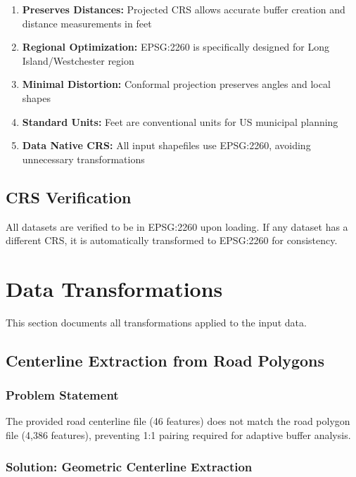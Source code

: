 \documentclass[11pt,letterpaper]{article}
\begin{document}
\begin{enumerate}
    \item \textbf{Preserves Distances:} Projected CRS allows accurate buffer creation and distance measurements in feet
    \item \textbf{Regional Optimization:} EPSG:2260 is specifically designed for Long Island/Westchester region
    \item \textbf{Minimal Distortion:} Conformal projection preserves angles and local shapes
    \item \textbf{Standard Units:} Feet are conventional units for US municipal planning
    \item \textbf{Data Native CRS:} All input shapefiles use EPSG:2260, avoiding unnecessary transformations
\end{enumerate}

\subsection{CRS Verification}

All datasets are verified to be in EPSG:2260 upon loading. If any dataset has a different CRS, it is automatically transformed to EPSG:2260 for consistency.

\section{Data Transformations}

This section documents all transformations applied to the input data.

\subsection{Centerline Extraction from Road Polygons}
\label{sec:centerline_extraction}

\subsubsection{Problem Statement}

The provided road centerline file (46 features) does not match the road polygon file (4,386 features), preventing 1:1 pairing required for adaptive buffer analysis.

\subsubsection{Solution: Geometric Centerline Extraction}
\end{document}
